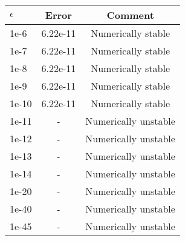 \begin{tabular}{lcc}
\toprule
$\epsilon$ & Error & Comment \\
\midrule
1e-6 & 6.22e-11 & Numerically stable \\
1e-7 & 6.22e-11 & Numerically stable \\
1e-8 & 6.22e-11 & Numerically stable \\
1e-9 & 6.22e-11 & Numerically stable \\
1e-10 & 6.22e-11 & Numerically stable \\
1e-11 & - & Numerically unstable \\
1e-12 & - & Numerically unstable \\
1e-13 & - & Numerically unstable \\
1e-14 & - & Numerically unstable \\
1e-20 & - & Numerically unstable \\
1e-40 & - & Numerically unstable \\
1e-45 & - & Numerically unstable \\
\bottomrule
\end{tabular}